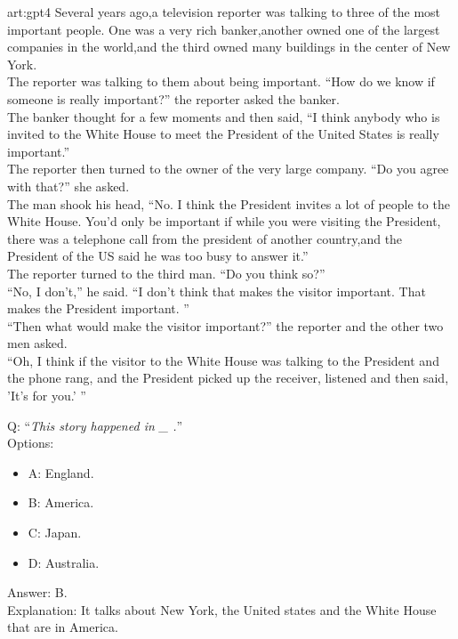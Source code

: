 \begin{passage}{art:gpt4}
 Several years ago,a television reporter was talking to three of the most important people. One was a very rich banker,another owned one of the largest companies in the world,and the third owned many buildings in the center of New York. \\
The reporter was talking to them about being important. ``How do we know if someone is really important?'' the reporter asked the banker. \\
The banker thought for a few moments and then said, ``I think anybody who is invited to the White House to meet the President of the United States is really important.'' \\
The reporter then turned to the owner of the very large company. ``Do you agree with that?'' she asked. \\
The man shook his head, ``No. I think the President invites a lot of people to the White House. You'd only be important if while you were visiting the President, there was a telephone call from the president of another country,and the President of the US said he was too busy to answer it.'' \\
The reporter turned to the third man. ``Do you think so?'' \\
``No, I don't,'' he said. ``I don't think that makes the visitor important. That makes the President important. '' \\
``Then what would make the visitor important?'' the reporter and the other two men asked. \\
``Oh, I think if the visitor to the White House was talking to the President and the phone rang, and the President picked up the receiver, listened and then said, 'It's for you.' '' \\
\end{passage}
Q: ``\emph{This story happened in   \_  .}''\\
Options: 
\begin{itemize}
 \item A: England.
 \item B: America.
 \item C: Japan.
 \item D: Australia.
\end{itemize}
Answer: B. \\
Explanation: It talks about New York, the United states and the White House that are in America.

